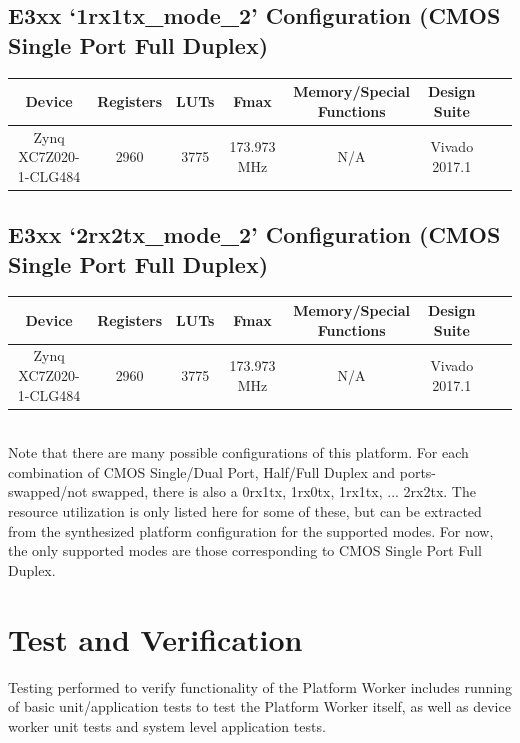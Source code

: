 \documentclass{article}
\begin{document}
\subsection*{E3xx `1rx1tx\_mode\_2' Configuration (CMOS Single Port Full Duplex)}
\begin{scriptsize}
	\begin{tabular}{|c|c|c|c|c|c|c|c|}
		\hline
		\rowcolor{blue}
		Device                & Registers & LUTs & Fmax        & Memory/Special Functions & Design Suite \\
		\hline
		Zynq XC7Z020-1-CLG484 & 2960      & 3775 & 173.973 MHz & N/A                      & Vivado 2017.1    \\
		\hline
	\end{tabular}
\end{scriptsize}

\subsection*{E3xx `2rx2tx\_mode\_2' Configuration (CMOS Single Port Full Duplex)}
\begin{scriptsize}
	\begin{tabular}{|c|c|c|c|c|c|c|c|}
		\hline
		\rowcolor{blue}
		Device                & Registers & LUTs & Fmax        & Memory/Special Functions & Design Suite \\
		\hline
		Zynq XC7Z020-1-CLG484 & 2960      & 3775 & 173.973 MHz & N/A                      & Vivado 2017.1    \\
		\hline
	\end{tabular}
\end{scriptsize}\\

\noindent Note that there are many possible configurations of this platform. For each combination of CMOS Single/Dual Port, Half/Full Duplex and ports-swapped/not swapped, there is also a 0rx1tx, 1rx0tx, 1rx1tx, ... 2rx2tx. The resource utilization is only listed here for some of these, but can be extracted from the synthesized platform configuration for the supported modes. For now, the only supported modes are those corresponding to CMOS Single Port Full Duplex.
\section*{Test and Verification}
\noindent Testing performed to verify functionality of the Platform Worker includes running of basic unit/application tests to test the Platform Worker itself, as well as device worker unit tests and system level application tests. \\
\end{document}
